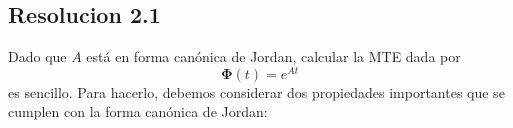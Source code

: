 \documentclass[
  11pt,
  letterpaper,
   addpoints,
   answers
  ]{exam}
\begin{document}
\begin{questions}
\begin{solution}
  \subsection*{Resolucion 2.1}
  Dado que $A$ está en forma canónica de Jordan, calcular la MTE dada por
\setcounter{equation}{2}
\begin{equation}
\bm{\Phi}(t)=e^{At}
\end{equation}
es sencillo. Para hacerlo, debemos considerar dos propiedades importantes que se cumplen con la forma canónica de Jordan:


\end{solution}
\end{questions}
\end{document}
